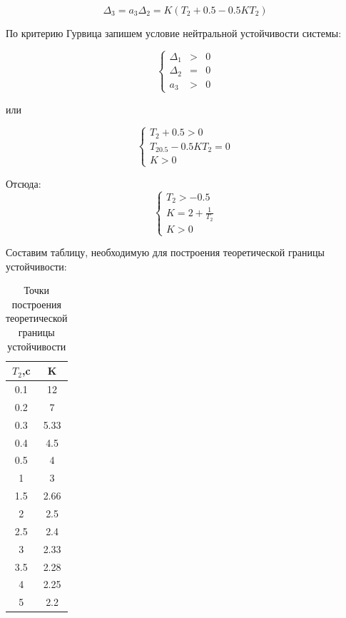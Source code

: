 \documentclass[a4paper, 11pt]{article}
\begin{document}
\begin{equation}
\Delta_3=a_3\Delta_2=K(T_2+0.5-0.5KT_2)
\end{equation}

\par 
По критерию Гурвица запишем условие нейтральной устойчивости системы:

\begin{equation}
\left\{
\begin{matrix}
\Delta_1 & > & 0 \\
\Delta_2 & = & 0 \\
a_3 & > & 0
\end{matrix}
\right. 
\end{equation}
 
\par 
или

\begin{equation}
\left\{
\begin{matrix}
T_2+0.5>0 \\
T_20.5-0.5KT_2=0 \\
K>0
\end{matrix}
\right. 
\end{equation}

\par 
Отсюда:
\begin{equation}
\left\{
\begin{matrix}
T_2>-0.5 \\
\displaystyle K=2+\frac{1}{T_2} \\
K>0
\end{matrix}
\right. 
\end{equation}

\par 
Составим таблицу, необходимую для построения теоретической границы устойчивости:

\newpage
\begin{table}
\caption{Точки построения теоретической границы устойчивости}
\begin{tabular}{|c|c|}
\hline
$T_2$,c & K \\
\hline
0.1 & 12 \\
\hline
0.2 & 7 \\
\hline
0.3 & 5.33 \\
\hline
0.4 & 4.5 \\
\hline
0.5 & 4 \\
\hline
1 & 3 \\
\hline
1.5 & 2.66 \\
\hline
2 & 2.5 \\
\hline
2.5 & 2.4 \\
\hline
3 & 2.33 \\
\hline
3.5 & 2.28 \\
\hline
4 & 2.25 \\
\hline
5 & 2.2 \\
\hline
\end{tabular}
\end{table}
\end{document}
